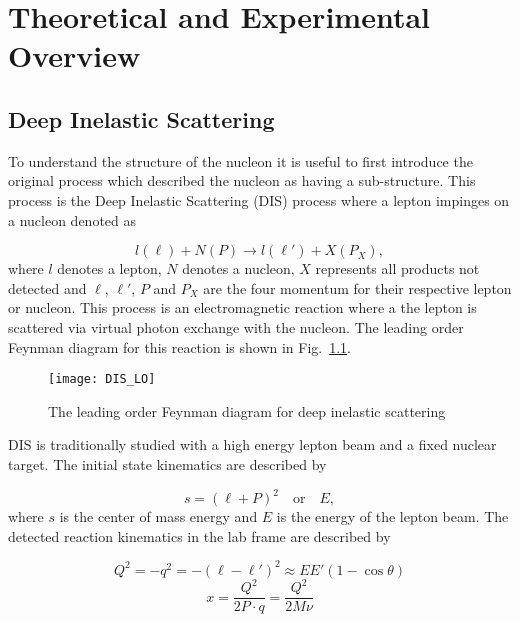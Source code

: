 \chapter{Theoretical and Experimental Overview} \label{ch::theory_exp}
\ifpdf
\graphicspath{{Chapters/Theory/Figs/Raster/}{Chapters/Theory/Figs/PDF/}{Chapters/Theory/Figs/}}
\else \graphicspath{{Chapters/Theory/Figs/Vector/}{Chapters/Theory/Figs/}}
\fi

\section{Deep Inelastic Scattering}
To understand the structure of the nucleon it is useful to first introduce the
original process which described the nucleon as having a sub-structure.  This
process is the Deep Inelastic Scattering (DIS) process where a lepton impinges
on a nucleon denoted as

\begin{equation}
l(\ell) + N(P) \rightarrow l(\ell') + X(P_X),
\end{equation}
\noindent
where $l$ denotes a lepton, $N$ denotes a nucleon, $X$ represents all products
not detected and $\ell$, $\ell'$, $P$ and $P_X$ are the four momentum for their
respective lepton or nucleon.  This process is an electromagnetic reaction where
a the lepton is scattered via virtual photon exchange with the nucleon.  The
leading order Feynman diagram for this reaction is shown in
Fig.~\ref{fig::DIS_LO}.

\begin{figure}[h!t]
  \centering
  \texttt{[image: DIS\_LO]}
  \caption{The leading order Feynman diagram for deep inelastic scattering}
  \label{fig::DIS_LO}
\end{figure}

DIS is traditionally studied with a high energy lepton beam and a fixed nuclear
target.  The initial state kinematics are described by

\begin{equation}
  s = (\ell+P)^2 \quad \mathrm{or} \quad E,
\end{equation}
\noindent
where $s$ is the center of mass energy and $E$ is the energy of the lepton beam.
The detected reaction kinematics in the lab frame are described by

\begin{multicols}{2}
  \noindent
  \begin{equation}
    \label{equ::DIS_Q2}
    Q^2 = -q^2 = -(\ell - \ell')^2 \approx EE'(1-\cos\theta )
  \end{equation}
  \begin{equation}
      \label{equ::BjorkenX}
      x = \frac{Q^2}{2P \cdot q} = \frac{Q^2}{2M\nu}
  \end{equation}
\end{multicols}

